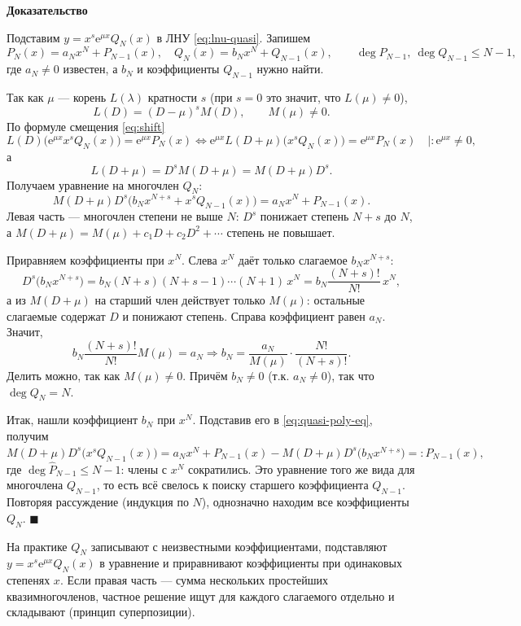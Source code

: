 \documentclass[12pt,a4paper]{article}
\numberwithin{equation}{section}
\newcommand{\e}{\mathrm{e}}
\renewenvironment{proof}[1][Доказательство]{\begin{center}\textbf{#1}\end{center}}{\hfill$\blacksquare$\par}
\begin{document}
\begin{proof}
Подставим \(y=x^s\e^{\mu x}Q_N(x)\) в ЛНУ \eqref{eq:lnu-quasi}. Запишем
\[
P_N(x)=a_Nx^N+P_{N-1}(x),\quad
Q_N(x)=b_Nx^N+Q_{N-1}(x),\qquad
\deg P_{N-1},\ \deg Q_{N-1}\le N-1,
\]
где \(a_N\neq0\) известен, а \(b_N\) и коэффициенты \(Q_{N-1}\) нужно найти.

Так как \(\mu\) --- корень \(L(\lambda)\) кратности \(s\) (при \(s=0\) это значит, что \(L(\mu)\neq0\)),
\[
L(D)=(D-\mu)^sM(D),\qquad M(\mu)\neq0.
\]
По формуле смещения \eqref{eq:shift}
\[
L(D)\bigl(\e^{\mu x}x^sQ_N(x)\bigr)=\e^{\mu x}P_N(x)
\iff
\e^{\mu x}L(D+\mu)\bigl(x^sQ_N(x)\bigr)=\e^{\mu x}P_N(x)\quad\Big|:\e^{\mu x}\neq0,
\]
а
\[
L(D+\mu)=D^sM(D+\mu)=M(D+\mu)D^s.
\]
Получаем уравнение на многочлен \(Q_N\):
\begin{equation}
M(D+\mu)D^s\bigl(b_Nx^{N+s}+x^sQ_{N-1}(x)\bigr)=a_Nx^N+P_{N-1}(x).
\label{eq:quasi-poly-eq}
\end{equation}
Левая часть --- многочлен степени не выше \(N\): \(D^s\) понижает степень \(N+s\) до \(N\), а \(M(D+\mu)=M(\mu)+c_1D+c_2D^2+\cdots\) степень не повышает.

Приравняем коэффициенты при \(x^N\). Слева \(x^N\) даёт только слагаемое \(b_Nx^{N+s}\):
\[
D^s\bigl(b_Nx^{N+s}\bigr)=b_N(N+s)(N+s-1)\cdots(N+1)\,x^N=b_N\frac{(N+s)!}{N!}\,x^N,
\]
а из \(M(D+\mu)\) на старший член действует только \(M(\mu)\): остальные слагаемые содержат \(D\) и понижают степень. Справа коэффициент равен \(a_N\). Значит,
\[
b_N\frac{(N+s)!}{N!}M(\mu)=a_N
\Longrightarrow
b_N=\frac{a_N}{M(\mu)}\cdot\frac{N!}{(N+s)!}.
\]
Делить можно, так как \(M(\mu)\neq0\). Причём \(b_N\neq0\) (т.к. \(a_N\neq0\)), так что \(\deg Q_N=N\).

Итак, нашли коэффициент \(b_N\) при \(x^N\). Подставив его в \eqref{eq:quasi-poly-eq}, получим
\[
M(D+\mu)D^s\bigl(x^sQ_{N-1}(x)\bigr)=a_Nx^N+P_{N-1}(x)-M(D+\mu)D^s\bigl(b_Nx^{N+s}\bigr)=:\hat P_{N-1}(x),
\]
где \(\deg\hat P_{N-1}\le N-1\): члены с \(x^N\) сократились. Это уравнение того же вида для многочлена \(Q_{N-1}\), то есть всё свелось к поиску старшего коэффициента \(Q_{N-1}\). Повторяя рассуждение (индукция по \(N\)), однозначно находим все коэффициенты \(Q_N\).
\end{proof}

\begin{remarkHSE}
На практике \(Q_N\) записывают с неизвестными коэффициентами, подставляют \(y=x^s\e^{\mu x}Q_N(x)\) в уравнение и приравнивают коэффициенты при одинаковых степенях \(x\). Если правая часть --- сумма нескольких простейших квазимногочленов, частное решение ищут для каждого слагаемого отдельно и складывают (принцип суперпозиции).
\end{remarkHSE}
\end{document}

